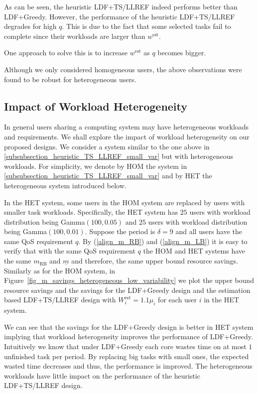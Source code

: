 \documentclass[prodmode,acmtompecs]{acmsmall}
\newcommand{\myComments}[1]{}
\newif\ifdissertation
\newcommand{\dissertationStart}{\ifdissertation  \myComments{Dissertation version: }}
\newcommand{\commentEnd}{\myComments{End}}
\begin{document}
As can be seen, the heuristic LDF+TS/LLREF indeed performs better than LDF+Greedy. However, the performance of the heuristic LDF+TS/LLREF degrades for high $q$. This is due to the fact that some selected tasks fail to complete since their workloads are larger than $w^\text{est}$. 
\dissertationStart
and that becomes a more critical problem as $q$ becomes bigger. 
\commentEnd\fi
One approach to solve this is to increase $w^\text{est}$ as $q$ becomes bigger. 
\dissertationStart
and we observe it can improve the resource savings for the heuristic LDF+TS/LLREF in large $q$ regime. 
\commentEnd\fi



Although we only considered homogeneous users, the above observations were found to be robust for heterogeneous users. 

\dissertationStart
\subsection{Impact of Workload Heterogeneity}
In general users sharing a computing system may have heterogeneous workloads and requirements. We shall explore the impact of workload heterogeneity on our proposed designs. We consider a system similar to the one above in \ref{subsubsection_heuristic_TS_LLREF_small_var} but with heterogeneous workloads. For simplicity, we denote by HOM the system in \ref{subsubsection_heuristic_TS_LLREF_small_var} and by HET the heterogeneous system introduced below. 

In the HET system, some users in the HOM system are replaced by users with smaller task workloads. 
Specifically, the HET system has $25$ users with workload distribution being Gamma$(100, 0.05)$ and $25$ users with workload distribution being Gamma$(100, 0.01)$. Suppose the period is $\delta = 9$ and all users have the same QoS requirement $q$. By (\ref{align_m_RB}) and (\ref{align_m_LB}) it is easy to verify that with the same QoS requirement $q$ the HOM and HET systems have the same $m_{\text{RB}}$ and $\underline{m}$ and therefore, the same upper bound resource savings. 
Similarly as for the HOM system, in Figure~{\ref{fig_m_savings_heterogeneous_low_variability}} we plot the upper bound resource savings and the savings for the LDF+Greedy design and the estimation based LDF+TS/LLREF design with $W_i^\text{est} = 1.1\mu_i$ for each user $i$ in the HET system. 

We can see that the savings for the LDF+Greedy design is better in HET system implying that workload heterogeneity improves the performance of LDF+Greedy. Intuitively we know that under LDF+Greedy each core wastes time on at most $1$ unfinished task per period. By replacing big tasks with small ones, the expected wasted time decreases and thus, the performance is improved. 
The heterogeneous workloads have little impact on the performance of the heuristic LDF+TS/LLREF design. 
\end{document}
